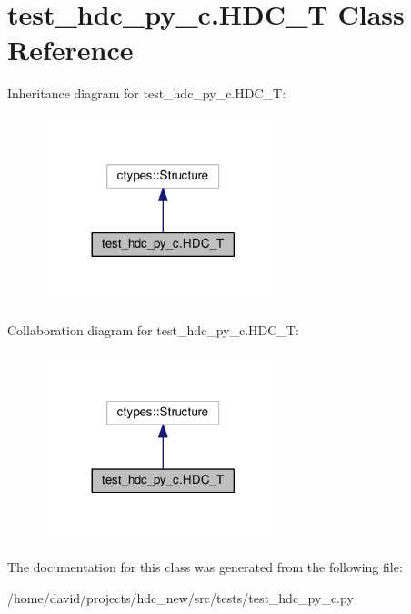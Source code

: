 \hypertarget{classtest__hdc__py__c_1_1_h_d_c___t}{}\section{test\+\_\+hdc\+\_\+py\+\_\+c.\+H\+D\+C\+\_\+T Class Reference}
\label{classtest__hdc__py__c_1_1_h_d_c___t}


Inheritance diagram for test\+\_\+hdc\+\_\+py\+\_\+c.\+H\+D\+C\+\_\+T\+:\nopagebreak
\begin{figure}[H]
\begin{center}
\leavevmode
\includegraphics[width=197pt]{classtest__hdc__py__c_1_1_h_d_c___t__inherit__graph}
\end{center}
\end{figure}


Collaboration diagram for test\+\_\+hdc\+\_\+py\+\_\+c.\+H\+D\+C\+\_\+T\+:\nopagebreak
\begin{figure}[H]
\begin{center}
\leavevmode
\includegraphics[width=197pt]{classtest__hdc__py__c_1_1_h_d_c___t__coll__graph}
\end{center}
\end{figure}


The documentation for this class was generated from the following file\+:\begin{DoxyCompactItemize}
\item 
/home/david/projects/hdc\+\_\+new/src/tests/test\+\_\+hdc\+\_\+py\+\_\+c.\+py\end{DoxyCompactItemize}
